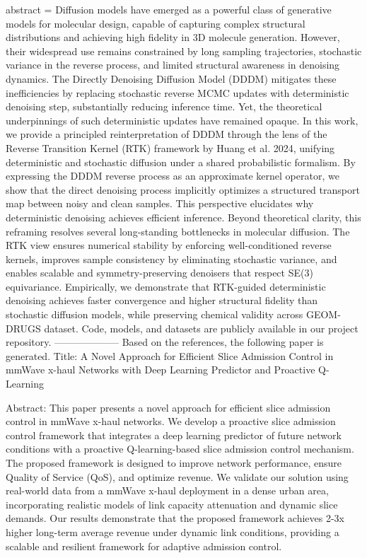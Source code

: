 {      abstract = {Diffusion models have emerged as a powerful class of generative models for molecular design, capable of capturing complex structural distributions and achieving high fidelity in 3D molecule generation. However, their widespread use remains constrained by long sampling trajectories, stochastic variance in the reverse process, and limited structural awareness in denoising dynamics. The Directly Denoising Diffusion Model (DDDM) mitigates these inefficiencies by replacing stochastic reverse MCMC updates with deterministic denoising step, substantially reducing inference time. Yet, the theoretical underpinnings of such deterministic updates have remained opaque. In this work, we provide a principled reinterpretation of DDDM through the lens of the Reverse Transition Kernel (RTK) framework by Huang et al. 2024, unifying deterministic and stochastic diffusion under a shared probabilistic formalism. By expressing the DDDM reverse process as an approximate kernel operator, we show that the direct denoising process implicitly optimizes a structured transport map between noisy and clean samples. This perspective elucidates why deterministic denoising achieves efficient inference. Beyond theoretical clarity, this reframing resolves several long-standing bottlenecks in molecular diffusion. The RTK view ensures numerical stability by enforcing well-conditioned reverse kernels, improves sample consistency by eliminating stochastic variance, and enables scalable and symmetry-preserving denoisers that respect SE(3) equivariance. Empirically, we demonstrate that RTK-guided deterministic denoising achieves faster convergence and higher structural fidelity than stochastic diffusion models, while preserving chemical validity across GEOM-DRUGS dataset. Code, models, and datasets are publicly available in our project repository.}
}
        --------------------
         Based on the references, the following paper is generated.
        Title: A Novel Approach for Efficient Slice Admission Control in mmWave x-haul Networks with Deep Learning Predictor and Proactive Q-Learning

        Abstract: This paper presents a novel approach for efficient slice admission control in mmWave x-haul networks. We develop a proactive slice admission control framework that integrates a deep learning predictor of future network conditions with a proactive Q-learning-based slice admission control mechanism. The proposed framework is designed to improve network performance, ensure Quality of Service (QoS), and optimize revenue. We validate our solution using real-world data from a mmWave x-haul deployment in a dense urban area, incorporating realistic models of link capacity attenuation and dynamic slice demands. Our results demonstrate that the proposed framework achieves 2-3x higher long-term average revenue under dynamic link conditions, providing a scalable and resilient framework for adaptive admission control.

